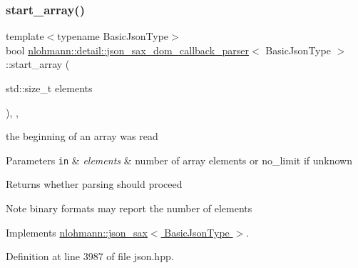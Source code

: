 \subsubsection{\texorpdfstring{start\+\_\+array()}{start\_array()}}
{\footnotesize\ttfamily template$<$typename Basic\+Json\+Type$>$ \\
bool \hyperlink{classnlohmann_1_1detail_1_1json__sax__dom__callback__parser}{nlohmann\+::detail\+::json\+\_\+sax\+\_\+dom\+\_\+callback\+\_\+parser}$<$ Basic\+Json\+Type $>$\+::start\+\_\+array (\begin{DoxyParamCaption}\item[{std\+::size\+\_\+t}]{elements }\end{DoxyParamCaption})\hspace{0.3cm}{\ttfamily [inline]}, {\ttfamily [override]}, {\ttfamily [virtual]}}



the beginning of an array was read 


\begin{DoxyParams}[1]{Parameters}
\mbox{\tt in}  & {\em elements} & number of array elements or no\+\_\+limit if unknown \\
\hline
\end{DoxyParams}
\begin{DoxyReturn}{Returns}
whether parsing should proceed 
\end{DoxyReturn}
\begin{DoxyNote}{Note}
binary formats may report the number of elements 
\end{DoxyNote}


Implements \hyperlink{structnlohmann_1_1json__sax_aa7717e96a46e41984260ebabab262369}{nlohmann\+::json\+\_\+sax$<$ Basic\+Json\+Type $>$}.



Definition at line 3987 of file json.\+hpp.

\mbox{\label{classnlohmann_1_1detail_1_1json__sax__dom__callback__parser_a6f10254970dbbc484f12752a7a3362b4}} 
